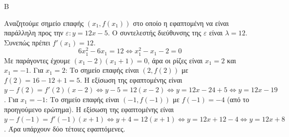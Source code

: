 \begin{thema}{Β}
\begin{erwthma}
\item Αναζητούμε σημείο επαφής $(x_1, f(x_1))$ στο οποίο η εφαπτομένη να είναι παράλληλη προς την $\varepsilon: y = 12x-5$. 
Ο συντελεστής διεύθυνσης της $\varepsilon$ είναι $\lambda = 12$. Συνεπώς πρέπει $f'(x_1) = 12$.
\[ 6x_1^2 - 6x_1 = 12 \Leftrightarrow x_1^2 - x_1 - 2 = 0 \]
Με παράγοντες έχουμε $(x_1 - 2)(x_1 + 1) = 0$, άρα οι ρίζες είναι $x_1 = 2$ και $x_1 = -1$.
Για $x_1 = 2$: Το σημείο επαφής είναι $(2, f(2))$ με $f(2) = 16 - 12 + 1 = 5$.
Η εξίσωση της εφαπτομένης είναι $y - f(2) = f'(2)(x-2) \Leftrightarrow y - 5 = 12(x-2) \Leftrightarrow y = 12x - 24 + 5 \Leftrightarrow y = 12x - 19$.
Για $x_1 = -1$: Το σημείο επαφής είναι $(-1, f(-1))$ με $f(-1) = -4$ (από το προηγούμενο ερώτημα).
Η εξίσωση της εφαπτομένης είναι $y - f(-1) = f'(-1)(x+1) \Leftrightarrow y + 4 = 12(x+1) \Leftrightarrow y = 12x + 12 - 4 \Leftrightarrow y = 12x + 8$.
Άρα υπάρχουν δύο τέτοιες εφαπτόμενες.
\end{erwthma}
\end{thema}
